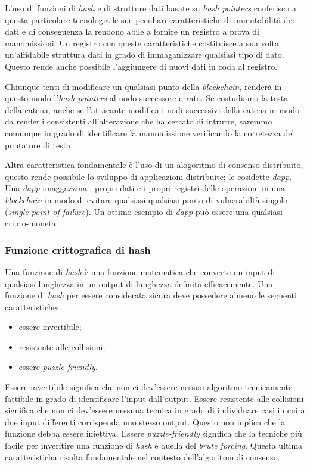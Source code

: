 L'uso di funzioni di \textit{hash} e di strutture dati basate su \emph{hash pointers} conferisco a questa particolare tecnologia le sue peculiari caratteristiche di immutabilità dei dati e di conseguenza la rendono abile a fornire un registro a prova di manomissioni. Un registro con queste caratteristiche costituisce a sua volta un'affidabile struttura dati in grado di immaganizzare qualsiasi tipo di dato. Questo rende anche possibile l'aggiungere di nuovi dati in coda al registro. 

Chiunque tenti di modificare un qualsiasi punto della \textit{blockchain}, renderà in questo modo l'\emph{hash pointers} al nodo successore errato. Se costudiamo la testa della catena, anche se l'attacante modifica i nodi successivi della catena in modo da renderli consistenti all'alterazione che ha cercato di intrurre, saremmo comunque in grado di identificare la manomissione verificando la corretezza del puntatore di testa.

Altra caratteristica fondamentale è l'uso di un alogoritmo di consenso distribuito, questo rende possibile lo sviluppo di applicazioni distribuite; le cosidette \emph{dapp}. Una \emph{dapp} imaggazzina i propri dati e i propri registri delle operazioni in una \emph{blockchain} in modo di evitare qualsiasi qualsiasi punto di vulnerabiltà singolo (\emph{single point of failure}). Un ottimo esempio di \emph{dapp} può essere una qualsiasi cripto-moneta.

\subsubsection{Funzione crittografica di hash}
Una funzione di \emph{hash} è una funzione matematica che converte un input di qualsiasi lunghezza in un output di lunghezza definita efficacemente. Una funzione di \emph{hash} per essere considerata sicura deve possedere almeno le seguenti caratteristiche:
\begin{itemize}
    \item essere invertibile;
    \item resistente alle collisioni;
    \item essere \textit{puzzle-friendly}.
\end{itemize}
Essere invertibile significa che non ci dev'essere nessun algoritmo tecnicamente fattibile in grado di identificare l'input dall'output.
Essere resistente alle collisioni significa che non ci dev'essere nessuna tecnica in grado di individuare casi in cui a due input differenti corrispenda uno stesso output. Questo non inplica che la funzione debba essere iniettiva.
Essere \textit{puzzle-friendly} significa che la tecniche più facile per inveritire una funzione di \emph{hash} è quella del \emph{brute forcing}. Questa ultima caratteristicha risulta fondamentale nel contesto dell'algoritmo di consenso.

